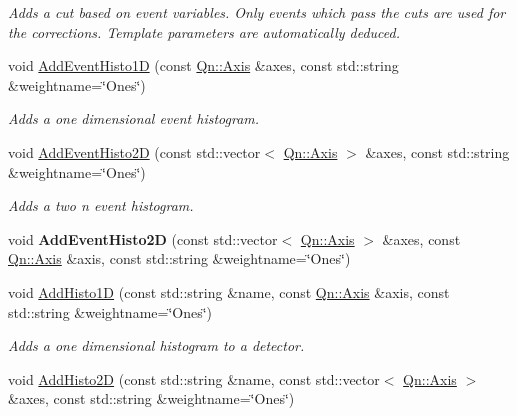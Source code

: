 \begin{DoxyCompactItemize}
\begin{DoxyCompactList}\small\item\em Adds a cut based on event variables. Only events which pass the cuts are used for the corrections. Template parameters are automatically deduced. \end{DoxyCompactList}\item 
void \mbox{\hyperlink{classQn_1_1CorrectionManager_af88739b02d1092c71474b790751ab6a6}{Add\+Event\+Histo1D}} (const \mbox{\hyperlink{classQn_1_1Axis}{Qn\+::\+Axis}} \&axes, const std\+::string \&weightname=\char`\"{}Ones\char`\"{})
\begin{DoxyCompactList}\small\item\em Adds a one dimensional event histogram. \end{DoxyCompactList}\item 
void \mbox{\hyperlink{classQn_1_1CorrectionManager_a85fdc9a031c498ba8385329aab2833bc}{Add\+Event\+Histo2D}} (const std\+::vector$<$ \mbox{\hyperlink{classQn_1_1Axis}{Qn\+::\+Axis}} $>$ \&axes, const std\+::string \&weightname=\char`\"{}Ones\char`\"{})
\begin{DoxyCompactList}\small\item\em Adds a two n event histogram. \end{DoxyCompactList}\item 
\mbox{\label{classQn_1_1CorrectionManager_abc317807236f7ce344cadfd36aa05e67}} 
void {\bfseries Add\+Event\+Histo2D} (const std\+::vector$<$ \mbox{\hyperlink{classQn_1_1Axis}{Qn\+::\+Axis}} $>$ \&axes, const \mbox{\hyperlink{classQn_1_1Axis}{Qn\+::\+Axis}} \&axis, const std\+::string \&weightname=\char`\"{}Ones\char`\"{})
\item 
void \mbox{\hyperlink{classQn_1_1CorrectionManager_a3ccccfe6ba70283c9ce9a045bd2c6440}{Add\+Histo1D}} (const std\+::string \&name, const \mbox{\hyperlink{classQn_1_1Axis}{Qn\+::\+Axis}} \&axis, const std\+::string \&weightname=\char`\"{}Ones\char`\"{})
\begin{DoxyCompactList}\small\item\em Adds a one dimensional histogram to a detector. \end{DoxyCompactList}\item 
void \mbox{\hyperlink{classQn_1_1CorrectionManager_ac00029f45e1bd68a608a148c1eb8fb7e}{Add\+Histo2D}} (const std\+::string \&name, const std\+::vector$<$ \mbox{\hyperlink{classQn_1_1Axis}{Qn\+::\+Axis}} $>$ \&axes, const std\+::string \&weightname=\char`\"{}Ones\char`\"{})

\end{DoxyCompactItemize}
